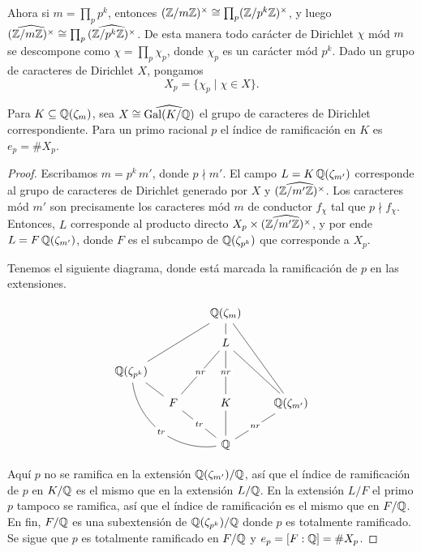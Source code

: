 Ahora si $m = \prod_p p^k$, entonces
$(\mathbb{Z}/m\mathbb{Z})^\times \cong \prod_p (\mathbb{Z}/p^k\mathbb{Z})^\times$, y luego
$\widehat{(\mathbb{Z}/m\mathbb{Z})^\times} \cong \prod_p \widehat{(\mathbb{Z}/p^k\mathbb{Z})^\times}$.
De esta manera todo carácter de Dirichlet $\chi$ mód $m$ se descompone como
$\chi = \prod_p \chi_p$, donde $\chi_p$ es un carácter mód $p^k$. Dado un grupo
de caracteres de Dirichlet $X$, pongamos
$$X_p = \{ \chi_p \mid \chi \in X \}.$$

\begin{teorema}
  Para $K \subseteq \mathbb{Q} (\zeta_m)$, sea $X \cong \widehat{\operatorname{Gal} (K/\mathbb{Q})}$
  el grupo de caracteres de Dirichlet correspondiente. Para un primo racional
  $p$ el índice de ramificación en $K$ es $e_p = \# X_p$.

  \begin{proof}
    Escribamos $m = p^k\,m'$, donde $p \nmid m'$.
    El campo $L = K\,\mathbb{Q} (\zeta_{m'})$ corresponde al grupo de caracteres de
    Dirichlet generado por $X$ y $\widehat{(\mathbb{Z}/m'\mathbb{Z})^\times}$. Los caracteres
    mód $m'$ son precisamente los caracteres mód $m$ de conductor $f_\chi$ tal
    que $p \nmid f_\chi$. Entonces, $L$ corresponde al producto directo
    $X_p \times \widehat{(\mathbb{Z}/m'\mathbb{Z})^\times}$, y por ende
    $L = F\,\mathbb{Q} (\zeta_{m'})$, donde $F$ es el subcampo de $\mathbb{Q} (\zeta_{p^k})$
    que corresponde a $X_p$.

    Tenemos el siguiente diagrama, donde está marcada la ramificación de $p$
    en las extensiones.

    \[ \begin{tikzcd}[row sep=1em, column sep=1em]
      & & & \QQ (\zeta_m)\ar[-]{d}\ar[-]{dddrr}\ar[-]{ddlll} \\
       & & & L\ar[-]{ddll}[description]{nr}\ar[-]{dd}[description]{nr}\ar[-]{ddrr} \\
      \QQ (\zeta_{p^k})\ar[-]{dr}\ar[-,bend right=45]{dddrrr}[description]{tr} \\
      & F\ar[-]{ddrr}[description]{tr} & & K\ar[-]{dd} & & \QQ (\zeta_{m'})\ar[-]{ddll}[description]{nr} \\
      \\
       & & & \QQ
    \end{tikzcd} \]

    Aquí $p$ no se ramifica en la extensión $\mathbb{Q} (\zeta_{m'})/\mathbb{Q}$, así que el
    índice de ramificación de $p$ en $K/\mathbb{Q}$ es el mismo que en la extensión
    $L/\mathbb{Q}$. En la extensión $L/F$ el primo $p$ tampoco se ramifica, así que
    el índice de ramificación es el mismo que en $F/\mathbb{Q}$.
    En fin, $F/\mathbb{Q}$ es una subextensión de $\mathbb{Q} (\zeta_{p^k})/\mathbb{Q}$ donde $p$
    es totalmente ramificado. Se sigue que $p$ es totalmente ramificado en
    $F/\mathbb{Q}$ y $e_p = [F : \mathbb{Q}] = \# X_p$.
  \end{proof}
\end{teorema}

